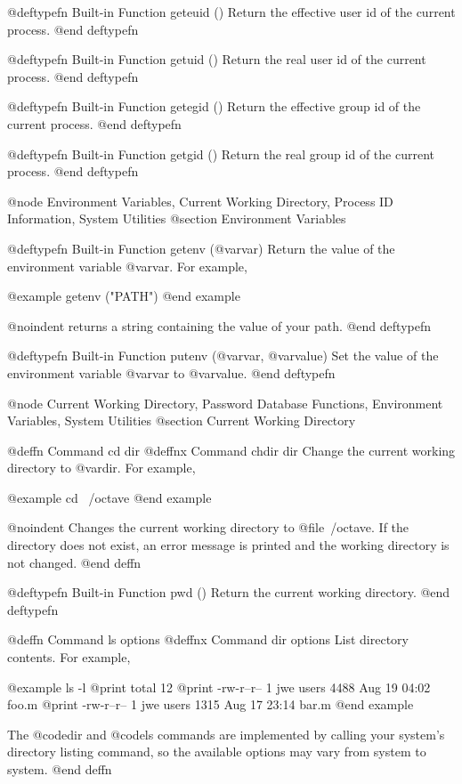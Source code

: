 {{@deftypefn {Built-in Function} {} geteuid ()
Return the effective user id of the current process.
@end deftypefn

@deftypefn {Built-in Function} {} getuid ()
Return the real user id of the current process.
@end deftypefn

@deftypefn {Built-in Function} {} getegid ()
Return the effective group id of the current process.
@end deftypefn

@deftypefn {Built-in Function} {} getgid ()
Return the real group id of the current process.
@end deftypefn

@node Environment Variables, Current Working Directory, Process ID Information, System Utilities
@section Environment Variables

@deftypefn {Built-in Function} {} getenv (@var{var})
Return the value of the environment variable @var{var}.  For example,

@example
getenv ("PATH")
@end example

@noindent
returns a string containing the value of your path.
@end deftypefn

@deftypefn {Built-in Function} {} putenv (@var{var}, @var{value})
Set the value of the environment variable @var{var} to @var{value}.
@end deftypefn

@node Current Working Directory, Password Database Functions, Environment Variables, System Utilities
@section Current Working Directory

@deffn {Command} cd dir
@deffnx {Command} chdir dir
Change the current working directory to @var{dir}.  For example,

@example
cd ~/octave
@end example

@noindent
Changes the current working directory to @file{~/octave}.  If the
directory does not exist, an error message is printed and the working
directory is not changed.
@end deffn

@deftypefn {Built-in Function} {} pwd ()
Return the current working directory.
@end deftypefn

@deffn {Command} ls options
@deffnx {Command} dir options
List directory contents.  For example,

@example
ls -l
     @print{} total 12
     @print{} -rw-r--r--   1 jwe  users  4488 Aug 19 04:02 foo.m
     @print{} -rw-r--r--   1 jwe  users  1315 Aug 17 23:14 bar.m
@end example

The @code{dir} and @code{ls} commands are implemented by calling your
system's directory listing command, so the available options may vary
from system to system.
@end deffn

}}
